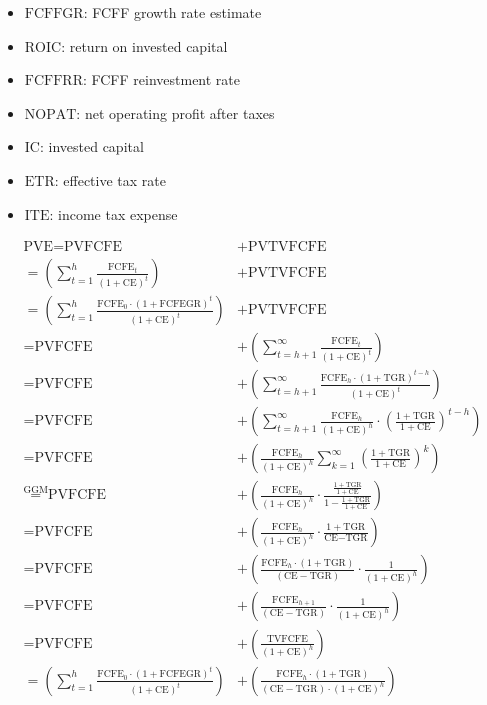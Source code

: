 \begin{itemize}
  \item[] $\text{FCFFGR}$: FCFF growth rate estimate
  \item[] $\text{ROIC}$: return on invested capital
  \item[] $\text{FCFFRR}$: FCFF reinvestment rate
  \item[] $\text{NOPAT}$: net operating profit after taxes
  \item[] $\text{IC}$: invested capital
  \item[] $\text{ETR}$: effective tax rate
  \item[] $\text{ITE}$: income tax expense
\end{itemize}

$$
\begin{aligned}
\text{PVE} = \text{PVFCFE} &+ \text{PVTVFCFE} \\ 
= \left( \sum_{t=1}^{h} \frac{\text{FCFE}_t}{(1 + \text{CE})^t} \right) &+ \text{PVTVFCFE} \\
= \left( \sum_{t=1}^{h} \frac{\text{FCFE}_0 \cdot (1+\text{FCFEGR})^t}{(1+\text{CE})^t} \right) &+ \text{PVTVFCFE} \\
= \text{PVFCFE} &+ \left( \sum_{t=h+1}^{\infty} \frac{\text{FCFE}_t}{(1 + \text{CE})^t} \right) \\
= \text{PVFCFE} &+ \left( \sum_{t=h+1}^{\infty} \frac{\text{FCFE}_h \cdot (1+\text{TGR})^{t-h}}{(1+\text{CE})^t} \right) \\
= \text{PVFCFE} &+ \left( \sum_{t=h+1}^{\infty} \frac{\text{FCFE}_h}{(1+\text{CE})^h} \cdot \left( \frac{1+\text{TGR}}{1+\text{CE}} \right)^{t-h} \right) \\
= \text{PVFCFE} &+ \left( \frac{\text{FCFE}_h}{(1+\text{CE})^h} \sum_{k=1}^{\infty} \left( \frac{1+\text{TGR}}{1+\text{CE}} \right)^k \right) \\
\overset{\text{GGM}}{=} \text{PVFCFE} &+ \left( \frac{\text{FCFE}_h}{(1+\text{CE})^h} \cdot \frac{\frac{1+\text{TGR}}{1+\text{CE}}}{1 - \frac{1+\text{TGR}}{1+\text{CE}}} \right) \\
= \text{PVFCFE} &+ \left( \frac{\text{FCFE}_h}{(1+\text{CE})^h} \cdot \frac{1+\text{TGR}}{\text{CE} - \text{TGR}} \right) \\
= \text{PVFCFE} &+ \left( \frac{\text{FCFE}_h \cdot (1+\text{TGR})}{(\text{CE} - \text{TGR})} \cdot \frac{1}{(1+\text{CE})^h} \right) \\ 
= \text{PVFCFE} &+ \left(\frac{\text{FCFE}_{h+1}}{(\text{CE} - \text{TGR})} \cdot \frac{1}{(1 + \text{CE})^h} \right) \\
= \text{PVFCFE} &+ \left(\frac{\text{TVFCFE}}{(1 + \text{CE})^h} \right) \\ 
= \left( \sum_{t=1}^{h} \frac{\text{FCFE}_0 \cdot (1+\text{FCFEGR})^t}{(1+\text{CE})^t} \right) &+ \left(\frac{\text{FCFE}_h \cdot (1+\text{TGR})}{(\text{CE} - \text{TGR}) \cdot (1 + \text{CE})^h} \right)
\end{aligned}
$$

